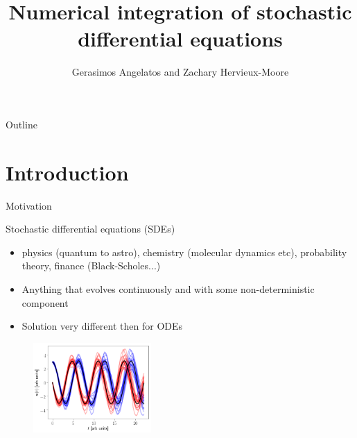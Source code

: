 \documentclass[]{beamer}
\title[] %
{Numerical integration of stochastic differential equations}
\author[] {Gerasimos Angelatos and  Zachary Hervieux-Moore
}
\institute[] {
\\[\medskipamount]
}
\date[] {}
\begin{document}
\AtBeginNote{\hspace*{-35pt} \begin{minipage}{1.15\textwidth} }
\AtEndNote{\end{minipage}}



\begin{frame}
 \titlepage
\end{frame}


\begin{frame}[noframenumbering]{Outline}
 \tableofcontents

\end{frame}

\section{Introduction}


\begin{frame}{Motivation}

\begin{block}{Stochastic differential equations (SDEs)}
\begin{itemize}
\item physics (quantum to astro), chemistry (molecular dynamics etc), probability theory, finance (Black-Scholes...)
\item Anything that evolves continuously and with some non-deterministic component
\end{itemize}
\end{block}
\begin{itemize}
  \setlength\itemsep{0.75em}
 \item Solution very different then for ODEs
\end{itemize}


\begin{figure}[t]
\vspace{-1pt}
\captionsetup[figure]{labelformat=empty}
\includegraphics[width=0.4\textwidth]{sampleSDE.png}
\end{figure}
\end{frame}
\end{document}
